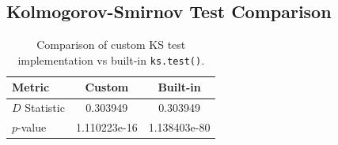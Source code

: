 \subsection*{Kolmogorov-Smirnov Test Comparison}
\begin{table}[h]
\centering
\begin{tabular}{lcc}
\hline
Metric & Custom & Built-in \\
\hline
$D$ Statistic & 0.303949 & 0.303949 \\
$p$-value & 1.110223e-16 & 1.138403e-80 \\
\hline
\end{tabular}
\caption{Comparison of custom KS test implementation vs built-in \texttt{ks.test()}.}
\label{tab:ks_comparison}
\end{table}
